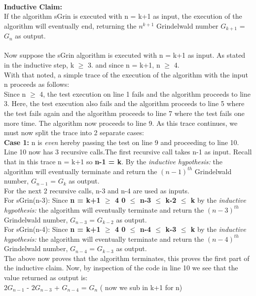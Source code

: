 \documentclass{article}
\begin{document}
    \\\textbf{Inductive Claim:}
    \\If the algorithm sGrin is executed with n = k+1 as input, the execution of the algorithm will eventually end, returning the $n^{k+1}$ Grindelwald number $G_{k+1}$ = $G_{n}$ as output.
    \\\\Now suppose the sGrin algorithm is executed with n = k+1 as input. As stated in the inductive step, k $\geq$ 3. and since n = k+1, n $\geq$ 4.
    \\With that noted, a simple trace of the execution of the algorithm with the input n proceeds as follows:
    \\Since  n $\geq$ 4, the test execution on line 1 fails and the algorithm proceeds to line 3. Here, the test execution also fails and the algorithm proceeds to line 5 where the test fails again and the algorithm proceeds to line 7 where the test fails one more time. The algorithm now proceeds to line 9.
    As this trace continues, we must now split the trace into 2 separate cases:
    \\
    \textbf{Case 1:} n is \textit{even} hereby passing the test on line 9 and proceeding to line 10.
    \\Line 10 now has 3 recursive calls.The first recursive call takes n-1 as input. Recall that in this trace n = k+1 so \textbf{n-1 = k}. By the \textit{inductive hypothesis: }the algorithm will eventually terminate and return the $(n-1)^{th}$ Grindelwald number, $G_{n-1}$ = $G_{k}$ as output.
    \\For the next 2 recursive calls, n-3 and n-4 are used as inputs.
    \\For sGrin(n-3): Since \textbf{n = k+1 $\geq$ 4 0 $\leq$ n-3 $\leq$ k-2 $\leq$ k} by the \textit{inductive hypothesis: }the algorithm will eventually terminate and return the $(n-3)^{th}$ Grindelwald number, $G_{n-3}$ =  $G_{k-2}$ as output.
    \\For sGrin(n-4): Since \textbf{n = k+1 $\geq$ 4 0 $\leq$ n-4 $\leq$ k-3 $\leq$ k} by the \textit{inductive hypothesis: }the algorithm will eventually terminate and return the $(n-4)^{th}$ Grindelwald number, $G_{n-4}$ =  $G_{k-3}$ as output.
    \\The above now proves that the algorithm terminates, this proves the first part of the inductive claim. Now, by inspection of the code in line 10 we see that the value returned as output is:\\
    $2G_{n-1}$  - $2G_{n-3}$ + $G_{n-4}$ = $G_{n}$ ( now we sub in k+1 for n)
\end{document}
